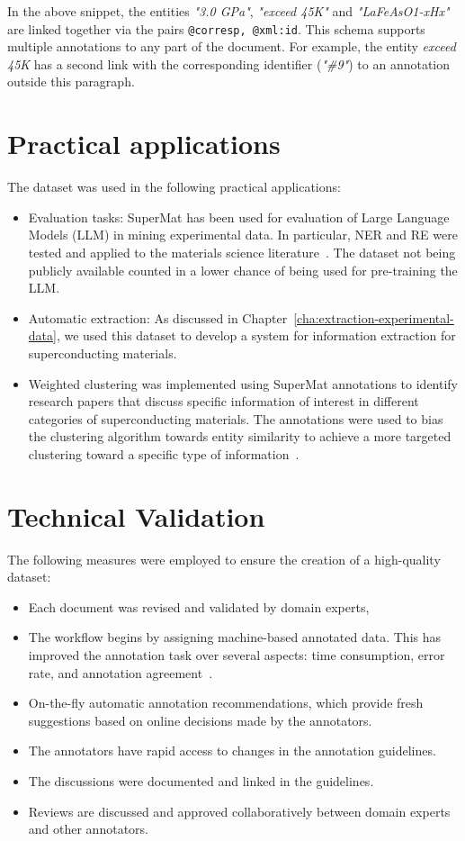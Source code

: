 In the above snippet, the entities \textit{"3.0 GPa"}, \textit{"exceed 45K"} and \textit{"LaFeAsO1-xHx"} are linked together via the pairs \texttt{@corresp, @xml:id}. 
This schema supports multiple annotations to any part of the document. 
For example, the entity \textit{exceed 45K} has a second link with the corresponding identifier (\textit{"\#9"}) to an annotation outside this paragraph.


\section{Practical applications}
The dataset was used in the following practical applications: 

\begin{itemize}
    \item Evaluation tasks: SuperMat has been used for evaluation of Large Language Models (LLM) in mining experimental data. In particular, NER and RE were tested and applied to the materials science literature~\cite{foppiano2024mining}. The dataset not being publicly available counted in a lower chance of being used for pre-training the LLM. 
    \item Automatic extraction: As discussed in Chapter~\ref{cha:extraction-experimental-data}, we used this dataset to develop a system for information extraction for superconducting materials.
    \item Weighted clustering was implemented using SuperMat annotations to identify research papers that discuss specific information of interest in different categories of superconducting materials. The annotations were used to bias the clustering algorithm towards entity similarity to achieve a more targeted clustering toward a specific type of information~\cite{dieb2022superconductor}.
\end{itemize}

\label{sec:technical-validation}
\section{Technical Validation} 
The following measures were employed to ensure the creation of a high-quality dataset: 
\begin{itemize}
    \item Each document was revised and validated by domain experts, 
    \item The workflow begins by assigning machine-based annotated data. This has improved the annotation task over several aspects: time consumption, error rate, and annotation agreement~\cite{Fort2010InfluenceOP,Nvol2011SemiautomaticSA,Lingren2014EvaluatingTI}.
    \item On-the-fly automatic annotation recommendations, which provide fresh suggestions based on online decisions made by the annotators.
    \item The annotators have rapid access to changes in the annotation guidelines.
    \item The discussions were documented and linked in the guidelines. 
    \item Reviews are discussed and approved collaboratively between domain experts and other annotators.
\end{itemize}

